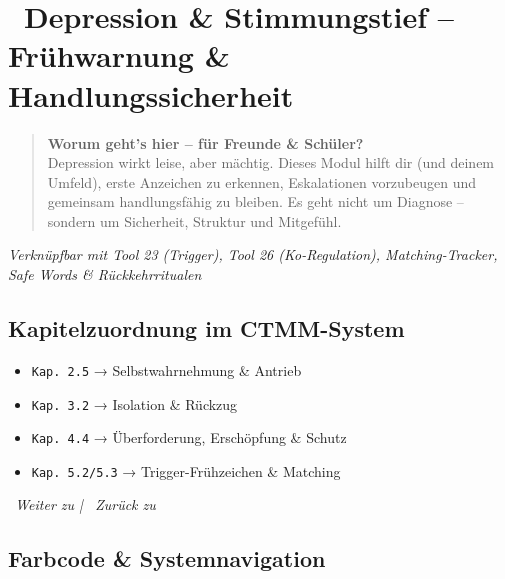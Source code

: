 \section*{\textcolor{ctmmBlue}{\faCloud~Depression \& Stimmungstief -- Frühwarnung \& Handlungssicherheit}}
\label{sec:depression}

\begin{quote}
\textbf{\textcolor{ctmmBlue}{Worum geht's hier -- für Freunde \& Schüler?}}\\
Depression wirkt leise, aber mächtig. Dieses Modul hilft dir (und deinem Umfeld), erste Anzeichen zu erkennen, Eskalationen vorzubeugen und gemeinsam handlungsfähig zu bleiben. Es geht nicht um Diagnose -- sondern um Sicherheit, Struktur und Mitgefühl.
\end{quote}

\textit{Verknüpfbar mit Tool 23 (Trigger), Tool 26 (Ko-Regulation), Matching-Tracker, Safe Words \& Rückkehrritualen}

\subsection*{\textcolor{ctmmBlue}{Kapitelzuordnung im CTMM-System}}

\begin{itemize}
  \item \texttt{Kap. 2.5} → Selbstwahrnehmung \& Antrieb
  \item \texttt{Kap. 3.2} → Isolation \& Rückzug
  \item \texttt{Kap. 4.4} → Überforderung, Erschöpfung \& Schutz
  \item \texttt{Kap. 5.2/5.3} → Trigger-Frühzeichen \& Matching
\end{itemize}

\vspace{0.5cm}
\begin{center}
\textit{\textcolor{ctmmGreen}{\faChevronRight~Weiter zu}  | \textcolor{ctmmBlue}{\faChevronLeft~Zurück zu} }
\end{center}

\subsection*{\textcolor{ctmmBlue}{Farbcode \& Systemnavigation}}

